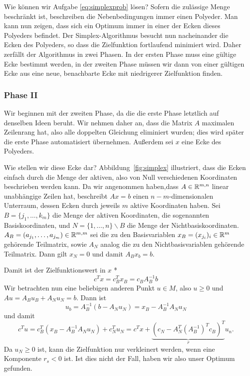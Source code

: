 Wie können wir Aufgabe \eqref{eq:simplexprob} lösen? Sofern die
zulässige Menge beschränkt ist, beschreiben die Nebenbedingungen immer
einen Polyeder. Man kann nun zeigen, dass sich ein Optimum immer in
einer der Ecken dieses Polyeders befindet. Der Simplex-Algorithmus
besucht nun nacheinander die Ecken des Polyeders, so dass die
Zielfunktion fortlaufend minimiert wird. Daher zerfällt der
Algorithmus in zwei Phasen. In der ersten Phase muss eine gültige Ecke
bestimmt werden, in der zweiten Phase müssen wir dann von einer
gültigen Ecke aus eine neue, benachbarte Ecke mit niedrigerer
Zielfunktion finden.

\subsubsection*{Phase II}

Wir beginnen mit der zweiten Phase, da die die erste Phase letztlich
auf denselben Ideen beruht. Wir nehmen daher an, dass die Matrix $A$
maximalen Zeilenrang hat, also alle doppelten Gleichung eliminiert
wurden; dies wird später die erste Phase automatisiert übernehmen.
Außerdem sei $x$ eine Ecke des Polyeders.

Wie stellen wir diese Ecke dar? Abbildung~\ref{fig:simplex}
illustriert, dass die Ecken einfach durch die Menge der aktiven, also
von Null verschiedenen Koordinaten beschrieben werden kann. Da wir
angenommen haben,dass $A\in\mathbb{R}^{m,n}$ linear unabhängige Zeilen hat,
beschreibt $Ax=b$ einen $n-m$-dimensionalen Unterraum, dessen Ecken
durch jeweils $m$ aktive Koordinaten haben. Sei $B=\{j_1,\ldots,k_m\}$
die Menge der aktiven Koordinaten, die sogenannten Basiskoordinaten,
und $N=\{1,\ldots,n\}\backslash B$ die Menge der
Nichtbasiskoordinaten. $A_B = (a_{j_1},\ldots,a_{j_m})\in\mathbb{R}^{m,m}$
sei die zu den Basisvariablen $x_B = (x_{j_i})_i\in\mathbb{R}^m$ gehörende
Teilmatrix, sowie $A_N$ analog die zu den Nichtbasisvariablen
gehörende Teilmatrix. Dann gilt $x_N=0$ und damit $A_Bx_b = b$.

Damit ist der Zielfunktionswert in $x$
*\begin{equation}
  c^Tx = c_B^Tx_B = c_BA_B^{-1}b
\end{equation}
Wir betrachten nun eine beliebigen anderen Punkt $u\in M$, also $u\ge
0$ und $Au=A_Bu_B + A_Nu_N = b$. Dann ist
\begin{equation}
  \label{eq:simplexub}
  u_b = A_B^{-1}(b - A_Nu_N) = x_B - A_B^{-1}A_Nu_N
\end{equation}
und damit
\begin{equation}
  c^Tu = c_B^T(x_B - A_B^{-1}A_Nu_N) + c_N^Tu_N = c^Tx +
  \underbrace{\left(c_N - A_N^T\left(A_B^{-1}\right)^Tc_B\right)^T}_{r}u_n.
\end{equation}
Da $u_N\ge 0$ ist, kann die Zielfunktion nur verkleinert werden, wenn
eine Komponente $r_s < 0$ ist. Ist dies nicht der Fall, haben wir also
unser Optimum gefunden.

